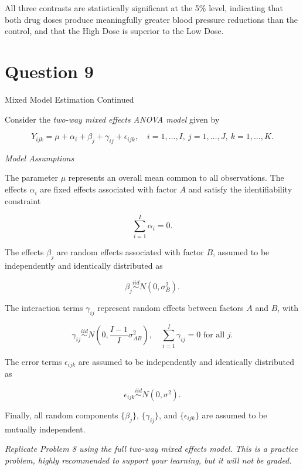 \documentclass[letterpaper]{article}
\begin{document}
			All three contrasts are statistically significant at the 5\% level,
			indicating that both drug doses produce meaningfully greater blood pressure
			reductions than the control, and that the High Dose is superior to the
			Low Dose.
	
	\clearpage
	
	\section{Question 9}
	{\color{deepred}   Mixed Model Estimation Continued}
		
		Consider the \textit{two-way mixed effects ANOVA model} given by
		
		\begin{equation}
			Y_{ijk} = \mu + \alpha_i + \beta_j + \gamma_{ij} + \epsilon_{ijk}, \quad i = 1, \ldots, I, \ j = 1, \ldots, J, \ k = 1, \ldots, K.
		\end{equation}
		
		\textit{Model Assumptions}
		
		The parameter $\mu$ represents an overall mean common to all observations. The effects $\alpha_i$ are fixed effects associated with factor $A$ and satisfy the identifiability constraint
		
		\[
		\sum_{i=1}^{I} \alpha_i = 0.
		\]
		
		The effects $\beta_j$ are random effects associated with factor $B$, assumed to be independently and identically distributed as
		
		\[
		\beta_j \overset{iid}{\sim} N(0, \sigma^2_B).
		\]
		
		The interaction terms $\gamma_{ij}$ represent random effects between factors $A$ and $B$, with
		
		\[
		\gamma_{ij} \overset{iid}{\sim} N\left(0, \frac{I-1}{I}\sigma^2_{AB}\right), \quad \sum_{i=1}^{I} \gamma_{ij} = 0 \text{ for all } j.
		\]
		
		The error terms $\epsilon_{ijk}$ are assumed to be independently and identically distributed as
		
		\[
		\epsilon_{ijk} \overset{iid}{\sim} N(0, \sigma^2).
		\]
		
		Finally, all random components $\{\beta_j\}$, $\{\gamma_{ij}\}$, and $\{\epsilon_{ijk}\}$ are assumed to be mutually independent.
		
		\textit{Replicate Problem 8 using the full two-way mixed effects model. This is a practice problem, highly recommended to support your learning, but it will not be graded.}
		
\end{document}
